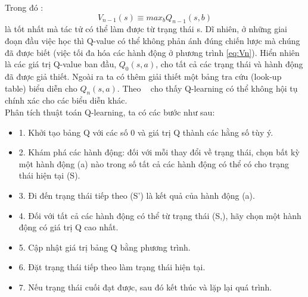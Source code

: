 Trong đó :
\begin{equation} 
    \label{eq:Vn}
    V_{n-1}(s) \equiv max_{b} {Q_{n-1}(s,b)}
\end{equation}
là tốt nhất mà tác tử có thể làm được từ trạng thái s. Dĩ nhiên, ở những giai đoạn đầu việc học thì Q-value có thể không phản ánh 
đúng chiến lược mà chúng đã được biết (việc tối đa hóa các hành động ở phương trình \ref{eq:Vn}). 
Hiển nhiên là các giá trị Q-value ban đầu, $Q_{0}(s,a)$, cho tất cả các trạng thái và hành động đã được giả thiết. Ngoài ra ta có thêm 
giải thiết một bảng tra cứu (look-up table) biểu diễn cho $Q_n(s,a)$. 
Theo ~\cite{Watkins1989} cho thấy Q-learning có thể không hội tụ chính xác cho các biểu diễn khác.\\
\indent Phân tích thuật toán Q-learning, ta có các bước như sau:
\begin{itemize}
    \item 1. Khởi tạo bảng Q với các số 0 và giá trị Q thành các hằng số tùy ý.
    \item 2. Khám phá các hành động: đối với mỗi thay đổi về trạng thái, chọn bất 
    kỳ một hành động (a) nào trong số tất cả các hành động có thể có cho trạng thái 
    hiện tại (S).
    \item 3. Đi đến trạng thái tiếp theo (S') là kết quả của hành động (a).
    \item 4. Đối với tất cả các hành động có thể từ trạng thái (S,), hãy chọn một hành 
    động có giá trị Q cao nhất.
    \item 5. Cập nhật giá trị bảng Q bằng phương trình.
    \item 6. Đặt trạng thái tiếp theo làm trạng thái hiện tại.
    \item 7. Nếu trạng thái cuối đạt được, sau đó kết thúc và lặp lại quá trình.
\end{itemize}
